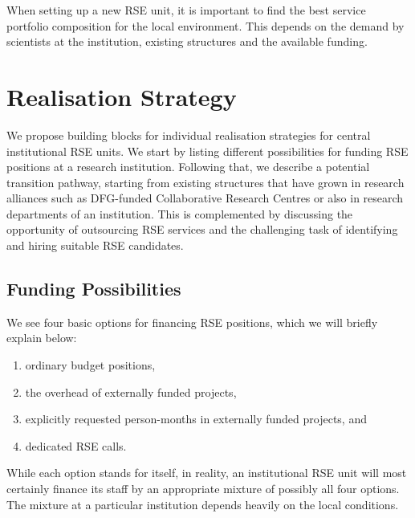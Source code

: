 \documentclass[a4paper]{article}
\begin{document}
When setting up a new RSE unit, it is important to find the best service portfolio composition for the local environment.
This depends on the demand by scientists at the institution, existing structures and the available funding.

\section{Realisation Strategy}%
\label{sec:realization}

We propose building blocks for individual realisation strategies for central institutional RSE units.
We start by listing different possibilities for funding RSE positions at a research institution.
Following that, we describe a potential transition pathway, starting from existing structures that have grown in research alliances such as DFG-funded Collaborative Research Centres or also in research departments of an institution.
This is complemented by discussing the opportunity of outsourcing RSE services and the challenging task of identifying and hiring suitable RSE candidates.

\subsection{Funding Possibilities}%
\label{sec:funding}

We see four basic options for financing RSE positions, which we will briefly explain below:
\begin{enumerate}
\item ordinary budget positions,
\item the overhead of externally funded projects,
\item explicitly requested person-months in externally funded projects, and
\item dedicated RSE calls.
\end{enumerate}
While each option stands for itself, in reality, an institutional RSE unit will most certainly finance its staff by an appropriate mixture of possibly all four options.
The mixture at a particular institution depends heavily on the local conditions.
\end{document}

